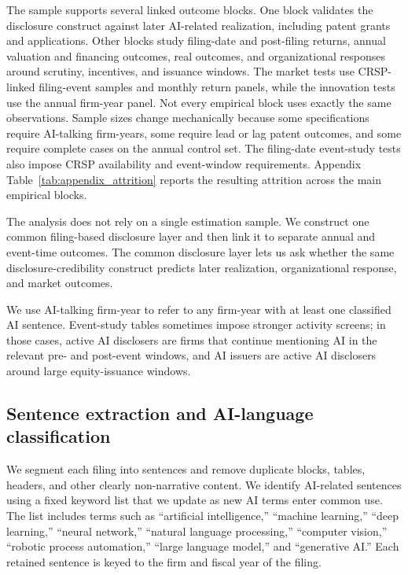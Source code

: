 The sample supports several linked outcome blocks. One block validates the disclosure construct against later AI-related realization, including patent grants and applications. Other blocks study filing-date and post-filing returns, annual valuation and financing outcomes, real outcomes, and organizational responses around scrutiny, incentives, and issuance windows. The market tests use CRSP-linked filing-event samples and monthly return panels, while the innovation tests use the annual firm-year panel. Not every empirical block uses exactly the same observations. Sample sizes change mechanically because some specifications require AI-talking firm-years, some require lead or lag patent outcomes, and some require complete cases on the annual control set. The filing-date event-study tests also impose CRSP availability and event-window requirements. Appendix Table~\ref{tab:appendix_attrition} reports the resulting attrition across the main empirical blocks.

The analysis does not rely on a single estimation sample. We construct one common filing-based disclosure layer and then link it to separate annual and event-time outcomes. The common disclosure layer lets us ask whether the same disclosure-credibility construct predicts later realization, organizational response, and market outcomes.

We use AI-talking firm-year to refer to any firm-year with at least one classified AI sentence. Event-study tables sometimes impose stronger activity screens; in those cases, active AI disclosers are firms that continue mentioning AI in the relevant pre- and post-event windows, and AI issuers are active AI disclosers around large equity-issuance windows.

\subsection{Sentence extraction and AI-language classification}

We segment each filing into sentences and remove duplicate blocks, tables, headers, and other clearly non-narrative content. We identify AI-related sentences using a fixed keyword list that we update as new AI terms enter common use. The list includes terms such as ``artificial intelligence,'' ``machine learning,'' ``deep learning,'' ``neural network,'' ``natural language processing,'' ``computer vision,'' ``robotic process automation,'' ``large language model,'' and ``generative AI.'' Each retained sentence is keyed to the firm and fiscal year of the filing.

